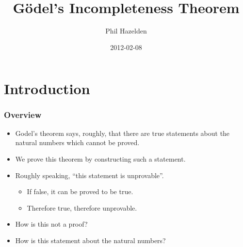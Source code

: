 \documentclass[mathserif]{beamer}
\title{Gödel's Incompleteness Theorem}
\author{Phil Hazelden}
\date{2012-02-08}
\begin{document}
\maketitle



\section{Introduction}
\label{sec-1}
\begin{frame}
\frametitle{Overview}
\label{sec-1-1}
\begin{itemize}

\item Godel's theorem says, roughly, that there are true statements about the natural numbers which cannot be proved.\\
\label{sec-1-1-1}%
\item We prove this theorem by constructing such a statement.\\
\label{sec-1-1-2}%
\item Roughly speaking, ``this statement is unprovable''.
\label{sec-1-1-3}%
\begin{itemize}

\item If false, it can be proved to be true.\\
\label{sec-1-1-3-1}%
\item Therefore true, therefore unprovable.\\
\label{sec-1-1-3-2}%
\end{itemize} %

\item How is this not a proof?\\
\label{sec-1-1-4}%
\item How is this statement about the natural numbers?\\
\label{sec-1-1-5}%
\end{itemize} %
\end{frame}
\end{document}
